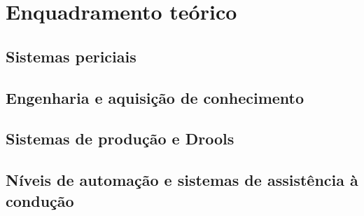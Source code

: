 \chapter{Enquadramento teórico}
\label{cap:enquadramento}

\section{Sistemas periciais}


\section{Engenharia e aquisição de conhecimento}


\section{Sistemas de produção e Drools}


\section{Níveis de automação e sistemas de assistência à condução}



